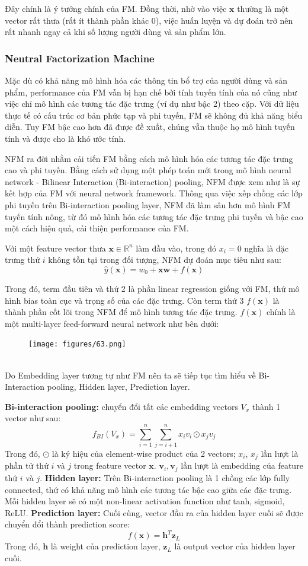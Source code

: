 Đây chính là ý tưởng chính của FM. Đồng thời, nhờ vào việc $\mathbf{x}$ thường là một vector rất thưa (rất ít thành phần khác 0),
việc huấn luyện và dự đoán trở nên rất nhanh ngay cả khi số lượng người dùng và sản phẩm lớn.

\subsubsection{Neutral Factorization Machine}
Mặc dù có khả năng mô hình hóa các thông tin bổ trợ của người dùng và sản phẩm, performance của FM vẫn bị hạn chế
bởi tính tuyến tính của nó cũng như việc chỉ mô hình các tương tác đặc trưng (ví dụ như bậc 2) theo cặp.
Với dữ liệu thực tế có cấu trúc cơ bản phức tạp và phi tuyến, FM sẽ không đủ khả năng biểu diễn.
Tuy FM bậc cao hơn đã được đề xuất, chúng vẫn thuộc họ mô hình tuyến tính và được cho là khó ước tính.

\indent NFM ra đời nhằm cải tiến FM bằng cách mô hình hóa các tương tác đặc trưng cao và phi tuyến.
Bằng cách sử dụng một phép toán mới trong mô hình neural network - Bilinear Interaction (Bi-interaction) pooling,
NFM được xem như là sự kết hợp của FM với neural network framework. Thông qua việc xếp chồng các lớp phi tuyến trên Bi-interaction pooling layer,
NFM đã làm sâu hơn mô hình FM tuyến tính nông, từ đó mô hình hóa các tương tác đặc trưng phi tuyến và bậc cao một cách hiệu quả, cải thiện performance của FM.

\indent Với một feature vector thưa $\mathbf{x} \in \mathbb{R}^{n}$ làm đầu vào, trong đó $x_i = 0$ nghĩa là đặc trưng thứ $i$ không tồn tại trong đối tượng,
NFM dự đoán mục tiêu như sau:
$$ \hat{y}(\mathbf{x}) = w_0 + \mathbf{xw} + f(\mathbf{x})$$

Trong đó, term đầu tiên và thứ 2 là phần linear regression giống với FM,
thứ mô hình bias toàn cục và trọng số của các đặc trưng. Còn term thứ 3 $f(\mathbf{x})$ là thành phần cốt lõi trong NFM
để mô hình tương tác đặc trưng. $f(\mathbf{x})$ chính là một multi-layer feed-forward neural network như bên dưới:
\begin{figure}[h]
    \centering
    \texttt{[image: figures/63.png]}
\end{figure}\\
Do Embedding layer tương tự như FM nên ta sẽ tiếp tục tìm hiểu về Bi-Interaction pooling, Hidden layer, Prediction layer.

\textbf{Bi-interaction pooling:} chuyển đổi tất các embedding vectors $V_x$ thành 1 vector như sau:
$$ f_{BI}(V_x) = \sum_{i=1}^{n} \sum_{j=i+1}^{n} x_i v_i \odot x_j v_j $$
Trong đó, $\odot$ là ký hiệu của element-wise product của 2 vectors; $x_i$, $x_j$ lần lượt
là phần tử thứ $i$ và $j$ trong feature vector $\mathbf{x}$. $\mathbf{v}_i, \mathbf{v}_j$ lần lượt là embedding của feature thứ $i$ và $j$.
\textbf{Hidden layer:} Trên Bi-interaction pooling là 1 chồng các lớp fully connected, thứ có khả năng mô hình các tương tác bậc cao giữa các đặc trưng.
Mỗi hidden layer sẽ có một non-linear activation function như tanh, sigmoid, ReLU.
\textbf{Prediction layer:} Cuối cùng, vector đầu ra của hidden layer cuối sẽ được chuyển đổi thành prediction score:
$$f(\mathbf{x}) = \mathbf{h}^T \mathbf{z}_L$$
Trong đó, $\mathbf{h}$ là weight của prediction layer, $\mathbf{z}_L$ là output vector của hidden layer cuối.
